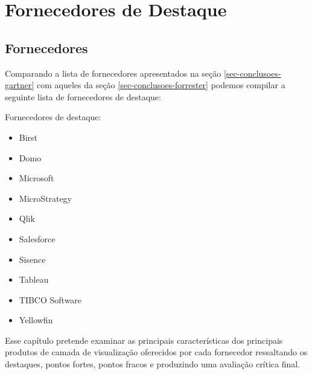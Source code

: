 \part{Fornecedores de Destaque}
\label{parte-plataformas}

\chapter{Fornecedores}
\label{cap-fornecedores}

Comparando a lista de fornecedores apresentados na seção \ref{sec-conclusoes-gartner} com aqueles da seção \ref{sec-conclusoes-forrester} podemos compilar a seguinte lista de fornecedores de destaque:

\begin{env-destaque}{Fornecedores de destaque:}
 \begin{multicols}{2}
    \begin{itemize}
        \item Birst
        \item Domo
        \item Microsoft
        \item MicroStrategy
        \item Qlik
        \item Salesforce
        \item Sisence
        \item Tableau
        \item TIBCO Software
        \item Yellowfin
    \end{itemize}
 \end{multicols}
\end{env-destaque}

Esse capítulo pretende examinar as principais características dos principais produtos de camada de visualização oferecidos por cada fornecedor ressaltando os destaques, pontos fortes, pontos fracos e produzindo uma avaliação crítica final.

\newpage





















